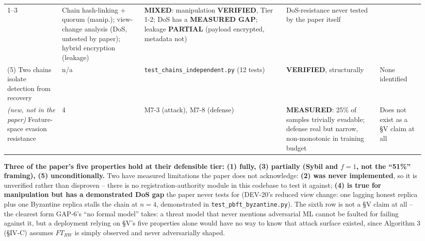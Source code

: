 \documentclass[conference]{IEEEtran}
\begin{document}
\begin{table}[t]
\begin{tabular}{p{3.2cm}p{1.1cm}p{3.7cm}p{3.0cm}p{3.8cm}}
1--3 &
Chain hash-linking + quorum (manip.); view-change analysis (DoS, untested by paper); hybrid encryption (leakage) &
\textbf{MIXED}: manipulation \textbf{VERIFIED}, Tier 1-2; DoS has a \textbf{MEASURED GAP}; leakage \textbf{PARTIAL} (payload encrypted, metadata not) &
DoS-resistance never tested by the paper itself \\
(5) Two chains isolate detection from recovery &
n/a &
\texttt{test\_\allowbreak chains\_\allowbreak independent.py} (12 tests) &
\textbf{VERIFIED}, structurally &
None identified \\
\emph{(new, not in the paper)} Feature-space evasion resistance &
4 &
M7-3 (attack), M7-8 (defense) &
\textbf{MEASURED}: 25\% of samples trivially evadable; defense real but narrow, non-monotonic in training budget &
Does not exist as a \S V claim at all \\
\hline
\end{tabular}
\end{table}

\textbf{Three of the paper's five properties hold at their defensible tier: (1) fully, (3)
partially (Sybil and $f{=}1$, not the ``51\%'' framing), (5) unconditionally.} Two have measured
limitations the paper does not acknowledge: \textbf{(2) was never implemented}, so it is
unverified rather than disproven -- there is no registration-authority module in this codebase to
test it against; \textbf{(4) is true for manipulation but has a demonstrated DoS gap} the paper
never tests for (DEV-20's reduced view change: one lagging honest replica plus one Byzantine
replica stalls the chain at $n{=}4$, demonstrated in \texttt{test\_pbft\_byzantine.py}). The
sixth row is not a \S V claim at all -- the clearest
form GAP-6's ``no formal model'' takes: a threat model that never mentions adversarial ML cannot
be faulted for failing against it, but a deployment relying on \S V's five properties alone would
have no way to know that attack surface existed, since Algorithm 3 (\S IV-C) assumes $FT_{RW}$ is
simply observed and never adversarially shaped.
\end{document}
